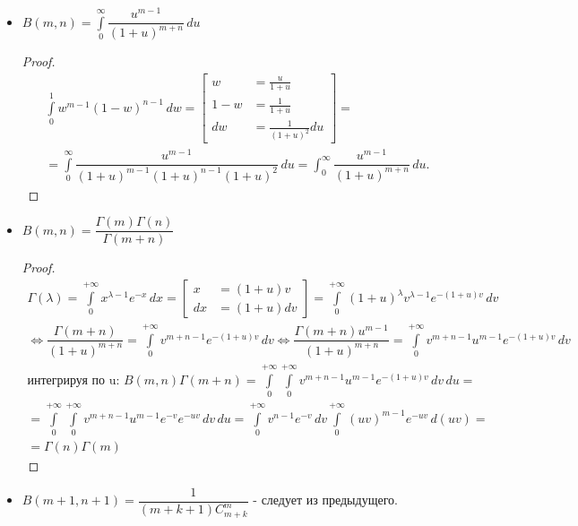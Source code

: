 \begin{itemize}
  \item $B(m, n) = \int\limits_0^\infty \dfrac{u^{m-1}}{(1+u)^{m+n}} \, du$
    \begin{proof}
      \begin{multline*}        
        \int\limits_0^1 w^{m-1} (1-w)^{n-1} \, dw = \left[
                \begin{aligned}
                  w &= \frac{u}{1+u} \\
                  1-w &= \frac{1}{1+u} \\
                  dw &= \frac{1}{(1+u)^2} du
                \end{aligned}
              \right] = \\
              = \int\limits_0^\infty \dfrac{u^{m-1}}{(1+u)^{m-1} (1+u)^{n-1} (1+u)^2} \, du = \int_0^\infty \dfrac{u^{m-1}}{(1+u)^{m+n}} \, du.
      \end{multline*}
    \end{proof}

  \item $B(m, n) = \dfrac{\Gamma(m) \Gamma(n)}{\Gamma(m+n)}$
    \begin{proof}
      \begin{multline*}
        \Gamma(\lambda) = \int\limits_0^{+\infty} x^{\lambda-1} e^{-x} \, dx =
        \left[ \begin{aligned} x &= (1+u)v \\ dx &= (1+u) dv \end{aligned} \right] =
        \int\limits_0^{+\infty} (1+u)^\lambda v^{\lambda-1} e^{-(1+u)v} \, dv \\
        \Leftrightarrow
        \dfrac{\Gamma(m+n)}{(1+u)^{m+n}} = \int\limits_0^{+\infty} v^{m+n-1} e^{-(1+u)v} \, dv \Leftrightarrow %
        \dfrac{\Gamma(m+n) u^{m-1}}{(1+u)^{m+n}} = \int\limits_0^{+\infty} v^{m+n-1} u^{m-1} e^{-(1+u)v} \, dv\\
        \text{интегрируя по u: }
        B(m, n) \Gamma(m+n) = \int\limits_0^{+\infty} \int\limits_0^{+\infty} v^{m+n-1} u^{m-1} e^{-(1+u) v} \, dv \, du = \\
        = \int\limits_0^{+\infty} \int\limits_0^{+\infty} v^{m+n-1} u^{m-1} e^{-v} e^{-uv} \, dv \, du =
        \int\limits_0^{+\infty} v^{n-1} e^{-v} \, dv \int\limits_0^{+\infty} (uv)^{m-1} e^{-uv} \, d(uv) = \\
        = \Gamma(n) \Gamma(m)
      \end{multline*}
    \end{proof}

  \item $B(m+1, n+1) = \dfrac{1}{(m+k+1) C_{m+k}^m}$ - следует из предыдущего.
\end{itemize}

